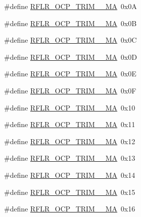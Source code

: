 \begin{DoxyCompactItemize}
\item 
\#define \mbox{\hyperlink{sx1276_regs-_lo_ra_8h_a701a4cf9ac291205389f408f2a37755b}{R\+F\+L\+R\+\_\+\+O\+C\+P\+\_\+\+T\+R\+I\+M\+\_\+\_\+\+MA}}~0x0A
\item 
\#define \mbox{\hyperlink{sx1276_regs-_lo_ra_8h_a9dde9ac43efb12556edd486e76ceec63}{R\+F\+L\+R\+\_\+\+O\+C\+P\+\_\+\+T\+R\+I\+M\+\_\+\_\+\+MA}}~0x0B
\item 
\#define \mbox{\hyperlink{sx1276_regs-_lo_ra_8h_afe5f0e6dfa00877d42470d27df2cf3ad}{R\+F\+L\+R\+\_\+\+O\+C\+P\+\_\+\+T\+R\+I\+M\+\_\+\_\+\+MA}}~0x0C
\item 
\#define \mbox{\hyperlink{sx1276_regs-_lo_ra_8h_a8e37fe5976b5ec9bc44a3b2af08924b6}{R\+F\+L\+R\+\_\+\+O\+C\+P\+\_\+\+T\+R\+I\+M\+\_\+\_\+\+MA}}~0x0D
\item 
\#define \mbox{\hyperlink{sx1276_regs-_lo_ra_8h_afaa7abafc08d83bcb214bf99ca93ee7c}{R\+F\+L\+R\+\_\+\+O\+C\+P\+\_\+\+T\+R\+I\+M\+\_\+\_\+\+MA}}~0x0E
\item 
\#define \mbox{\hyperlink{sx1276_regs-_lo_ra_8h_aab5037b9ac3e1bc7e2eedccf9193ba28}{R\+F\+L\+R\+\_\+\+O\+C\+P\+\_\+\+T\+R\+I\+M\+\_\+\_\+\+MA}}~0x0F
\item 
\#define \mbox{\hyperlink{sx1276_regs-_lo_ra_8h_a883d12dc95ff98fb03fc31ce6ddc2811}{R\+F\+L\+R\+\_\+\+O\+C\+P\+\_\+\+T\+R\+I\+M\+\_\+\_\+\+MA}}~0x10
\item 
\#define \mbox{\hyperlink{sx1276_regs-_lo_ra_8h_a6a2eac9941486d2997adb00c19f49d98}{R\+F\+L\+R\+\_\+\+O\+C\+P\+\_\+\+T\+R\+I\+M\+\_\+\_\+\+MA}}~0x11
\item 
\#define \mbox{\hyperlink{sx1276_regs-_lo_ra_8h_af9d84c5fa6e8da9a6e9cf68ebe748a18}{R\+F\+L\+R\+\_\+\+O\+C\+P\+\_\+\+T\+R\+I\+M\+\_\+\_\+\+MA}}~0x12
\item 
\#define \mbox{\hyperlink{sx1276_regs-_lo_ra_8h_a3755351c3f7f7842a523b6e7627545fe}{R\+F\+L\+R\+\_\+\+O\+C\+P\+\_\+\+T\+R\+I\+M\+\_\+\_\+\+MA}}~0x13
\item 
\#define \mbox{\hyperlink{sx1276_regs-_lo_ra_8h_a13dba4245f8c69fe3dee74ebeaad4ed3}{R\+F\+L\+R\+\_\+\+O\+C\+P\+\_\+\+T\+R\+I\+M\+\_\+\_\+\+MA}}~0x14
\item 
\#define \mbox{\hyperlink{sx1276_regs-_lo_ra_8h_a58209162f626269790dcb91f81340f9d}{R\+F\+L\+R\+\_\+\+O\+C\+P\+\_\+\+T\+R\+I\+M\+\_\+\_\+\+MA}}~0x15
\item 
\#define \mbox{\hyperlink{sx1276_regs-_lo_ra_8h_a27d3cfb3df1cbf0d08af0ba9e57aae49}{R\+F\+L\+R\+\_\+\+O\+C\+P\+\_\+\+T\+R\+I\+M\+\_\+\_\+\+MA}}~0x16

\end{DoxyCompactItemize}
